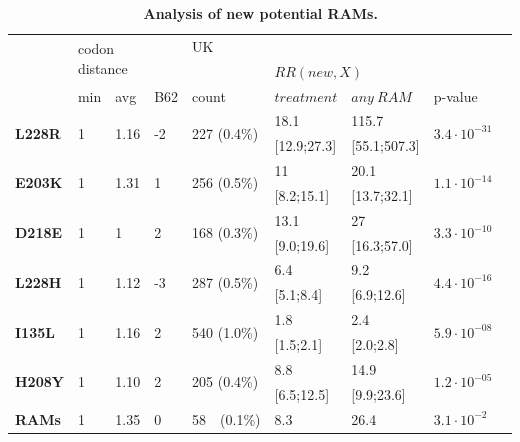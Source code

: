 \documentclass[
  11,
]{scrbook}
\begin{document}
\begin{table}[!htt]
\centering
\caption{\textbf{Analysis of new potential RAMs.}}
\begin{tabular}{@{}lllllllll@{}}
\hline
\multirow{3}{*}{} & \multicolumn{2}{l}{\multirow{2}{*}{codon distance}} & & \multicolumn{3}{l}{UK} & \\ \cmidrule(lr){5-7}
& \multicolumn{2}{l}{} & & & \multicolumn{2}{l}{$RR(new,X)$} & \\ \cmidrule(lr){2-3} \cmidrule(lr){6-7}
& min & avg & B62 & count & $treatment$ & $any~RAM$ & p-value \\ \hline
\multirow{2}{*}{\textbf{L228R}} & \multirow{2}{*}{1} & \multirow{2}{*}{1.16} & \multirow{2}{*}{-2} & \multirow{2}{*}{227 (0.4\%)} & 18.1 & 115.7 & \multirow{2}{*}{$3.4\cdot10^{-31}$} \\
& & & & & {[}12.9;27.3{]} & {[}55.1;507.3{]} & \\
\multirow{2}{*}{\textbf{E203K}} & \multirow{2}{*}{1} & \multirow{2}{*}{1.31} & \multirow{2}{*}{1} & \multirow{2}{*}{256 (0.5\%)} & 11 & 20.1 & \multirow{2}{*}{$1.1\cdot10^{-14}$} \\
& & & & & {[}8.2;15.1{]} & {[}13.7;32.1{]} & \\
\multirow{2}{*}{\textbf{D218E}} & \multirow{2}{*}{1} & \multirow{2}{*}{1} & \multirow{2}{*}{2} & \multirow{2}{*}{168 (0.3\%)} & 13.1 & 27 & \multirow{2}{*}{$3.3\cdot10^{-10}$} \\
& & & & & {[}9.0;19.6{]} & {[}16.3;57.0{]} & \\
\multirow{2}{*}{\textbf{L228H}} & \multirow{2}{*}{1} & \multirow{2}{*}{1.12} & \multirow{2}{*}{-3} & \multirow{2}{*}{287 (0.5\%)} & 6.4 & 9.2 & \multirow{2}{*}{$4.4\cdot10^{-16}$} \\
& & & & & {[}5.1;8.4{]} & {[}6.9;12.6{]} & \\
\multirow{2}{*}{\textbf{I135L}} & \multirow{2}{*}{1} & \multirow{2}{*}{1.16} & \multirow{2}{*}{2} & \multirow{2}{*}{540 (1.0\%)} & 1.8 & 2.4 & \multirow{2}{*}{$5.9\cdot10^{-08}$} \\
& & & & & {[}1.5;2.1{]} & {[}2.0;2.8{]} & \\
\multirow{2}{*}{\textbf{H208Y}} & \multirow{2}{*}{1} & \multirow{2}{*}{1.10} & \multirow{2}{*}{2} & \multirow{2}{*}{205 (0.4\%)} & 8.8 & 14.9 & \multirow{2}{*}{$1.2\cdot10^{-05}$} \\
& & & & & {[}6.5;12.5{]} & {[}9.9;23.6{]} & \\ \hline
\textbf{RAMs} & 1 & 1.35 & 0 & 58~~(0.1\%) & 8.3 & 26.4 & $3.1\cdot10^{-2}$\\

\end{tabular}
\end{table}
\end{document}
